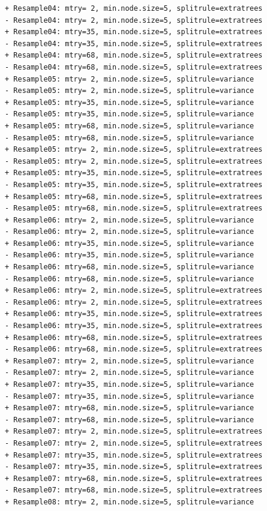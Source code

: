 \documentclass[
  letterpaper,
  DIV=11,
  numbers=noendperiod]{scrartcl}
\begin{document}
\begin{verbatim}
+ Resample04: mtry= 2, min.node.size=5, splitrule=extratrees 
- Resample04: mtry= 2, min.node.size=5, splitrule=extratrees 
+ Resample04: mtry=35, min.node.size=5, splitrule=extratrees 
- Resample04: mtry=35, min.node.size=5, splitrule=extratrees 
+ Resample04: mtry=68, min.node.size=5, splitrule=extratrees 
- Resample04: mtry=68, min.node.size=5, splitrule=extratrees 
+ Resample05: mtry= 2, min.node.size=5, splitrule=variance 
- Resample05: mtry= 2, min.node.size=5, splitrule=variance 
+ Resample05: mtry=35, min.node.size=5, splitrule=variance 
- Resample05: mtry=35, min.node.size=5, splitrule=variance 
+ Resample05: mtry=68, min.node.size=5, splitrule=variance 
- Resample05: mtry=68, min.node.size=5, splitrule=variance 
+ Resample05: mtry= 2, min.node.size=5, splitrule=extratrees 
- Resample05: mtry= 2, min.node.size=5, splitrule=extratrees 
+ Resample05: mtry=35, min.node.size=5, splitrule=extratrees 
- Resample05: mtry=35, min.node.size=5, splitrule=extratrees 
+ Resample05: mtry=68, min.node.size=5, splitrule=extratrees 
- Resample05: mtry=68, min.node.size=5, splitrule=extratrees 
+ Resample06: mtry= 2, min.node.size=5, splitrule=variance 
- Resample06: mtry= 2, min.node.size=5, splitrule=variance 
+ Resample06: mtry=35, min.node.size=5, splitrule=variance 
- Resample06: mtry=35, min.node.size=5, splitrule=variance 
+ Resample06: mtry=68, min.node.size=5, splitrule=variance 
- Resample06: mtry=68, min.node.size=5, splitrule=variance 
+ Resample06: mtry= 2, min.node.size=5, splitrule=extratrees 
- Resample06: mtry= 2, min.node.size=5, splitrule=extratrees 
+ Resample06: mtry=35, min.node.size=5, splitrule=extratrees 
- Resample06: mtry=35, min.node.size=5, splitrule=extratrees 
+ Resample06: mtry=68, min.node.size=5, splitrule=extratrees 
- Resample06: mtry=68, min.node.size=5, splitrule=extratrees 
+ Resample07: mtry= 2, min.node.size=5, splitrule=variance 
- Resample07: mtry= 2, min.node.size=5, splitrule=variance 
+ Resample07: mtry=35, min.node.size=5, splitrule=variance 
- Resample07: mtry=35, min.node.size=5, splitrule=variance 
+ Resample07: mtry=68, min.node.size=5, splitrule=variance 
- Resample07: mtry=68, min.node.size=5, splitrule=variance 
+ Resample07: mtry= 2, min.node.size=5, splitrule=extratrees 
- Resample07: mtry= 2, min.node.size=5, splitrule=extratrees 
+ Resample07: mtry=35, min.node.size=5, splitrule=extratrees 
- Resample07: mtry=35, min.node.size=5, splitrule=extratrees 
+ Resample07: mtry=68, min.node.size=5, splitrule=extratrees 
- Resample07: mtry=68, min.node.size=5, splitrule=extratrees 
+ Resample08: mtry= 2, min.node.size=5, splitrule=variance 

\end{verbatim}
\end{document}
